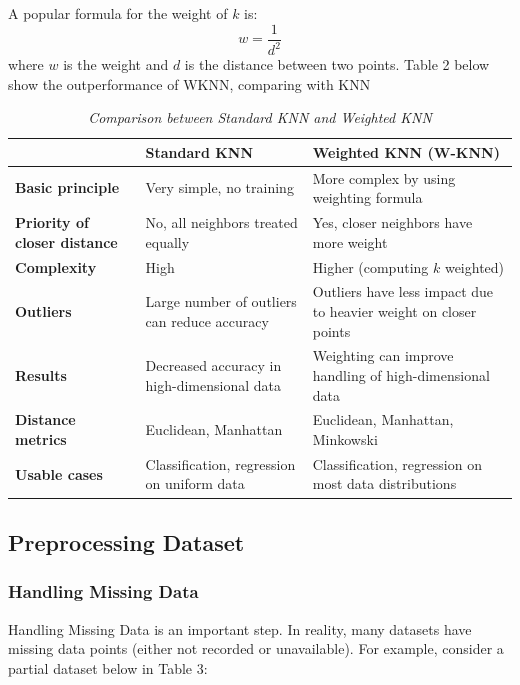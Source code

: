 \documentclass[10pt,twocolumn]{article}
\begin{document}
A popular formula for the weight of $k$ \cite{tarakci2021,jadhav2014} is:
\begin{equation}
    w = \frac{1}{d^2} 
\end{equation}
where \( w \) is the weight and \( d \) is the distance between two points. Table 2 below show the outperformance of WKNN, comparing with KNN

\begin{table}[!ht]
\centering
\caption{\textit{Comparison between Standard KNN and Weighted KNN}}
\renewcommand{\arraystretch}{1.5} %
\begin{tabular}{|p{4cm}|p{5cm}|p{5cm}|}
\hline
 & \textbf{Standard KNN} & \textbf{Weighted KNN (W-KNN)} \\
\hline
\textbf{Basic principle} & Very simple, no training & More complex by using weighting formula \\
\hline
\textbf{Priority of closer distance} & No, all neighbors treated equally & Yes, closer neighbors have more weight \\
\hline
\textbf{Complexity} & High & Higher (computing $k$ weighted) \\
\hline
\textbf{Outliers} & Large number of outliers can reduce accuracy & Outliers have less impact due to heavier weight on closer points \\
\hline
\textbf{Results} & Decreased accuracy in high-dimensional data & Weighting can improve handling of high-dimensional data \\
\hline
\textbf{Distance metrics} & Euclidean, Manhattan & Euclidean, Manhattan, Minkowski \\
\hline
\textbf{Usable cases} & Classification, regression on uniform data & Classification, regression on most data distributions \\
\hline
\end{tabular}
\end{table}


\subsection{Preprocessing Dataset}

\subsubsection{Handling Missing Data}
Handling Missing Data \cite{buhi2008} is an important step. In reality, many datasets have missing data points (either not recorded or unavailable). For example, consider a partial dataset below in Table 3:
\end{document}
